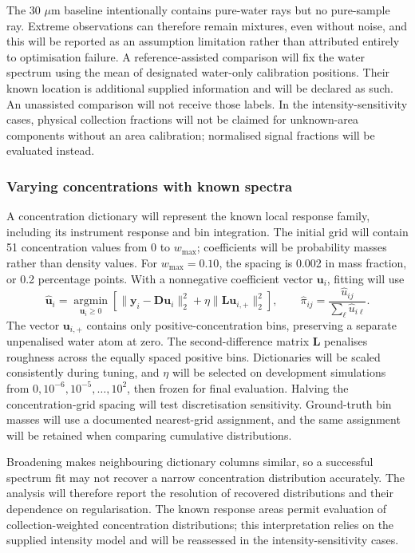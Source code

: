\documentclass[11pt]{article}
\newcommand{\wmax}{w_{\max}}
\begin{document}
The 30 $\mu\mathrm m$ baseline intentionally contains pure-water rays but no pure-sample ray. Extreme observations can therefore remain mixtures, even without noise, and this will be reported as an assumption limitation rather than attributed entirely to optimisation failure. A reference-assisted comparison will fix the water spectrum using the mean of designated water-only calibration positions. Their known location is additional supplied information and will be declared as such. An unassisted comparison will not receive those labels. In the intensity-sensitivity cases, physical collection fractions will not be claimed for unknown-area components without an area calibration; normalised signal fractions will be evaluated instead.

\subsubsection{Varying concentrations with known spectra}

A concentration dictionary will represent the known local response family, including its instrument response and bin integration. The initial grid will contain 51 concentration values from 0 to $\wmax$; coefficients will be probability masses rather than density values. For $\wmax=0.10$, the spacing is 0.002 in mass fraction, or 0.2 percentage points. With a nonnegative coefficient vector $\mathbf u_i$, fitting will use
\begin{equation}
 \widehat{\mathbf u}_i=\underset{\mathbf u_i\geq0}{\operatorname{argmin}}
 \left[\|\mathbf y_i-\mathbf D\mathbf u_i\|_2^2+
 \eta\|\mathbf L\mathbf u_{i,+}\|_2^2\right],\qquad
 \widehat\pi_{ij}=\frac{\widehat u_{ij}}{\sum_\ell\widehat u_{i\ell}}.
 \label{eq:regularised_distribution}
\end{equation}
The vector $\mathbf u_{i,+}$ contains only positive-concentration bins, preserving a separate unpenalised water atom at zero. The second-difference matrix $\mathbf L$ penalises roughness across the equally spaced positive bins. Dictionaries will be scaled consistently during tuning, and $\eta$ will be selected on development simulations from $0,10^{-6},10^{-5},\ldots,10^2$, then frozen for final evaluation. Halving the concentration-grid spacing will test discretisation sensitivity. Ground-truth bin masses will use a documented nearest-grid assignment, and the same assignment will be retained when comparing cumulative distributions.

Broadening makes neighbouring dictionary columns similar, so a successful spectrum fit may not recover a narrow concentration distribution accurately. The analysis will therefore report the resolution of recovered distributions and their dependence on regularisation. The known response areas permit evaluation of collection-weighted concentration distributions; this interpretation relies on the supplied intensity model and will be reassessed in the intensity-sensitivity cases.
\end{document}
